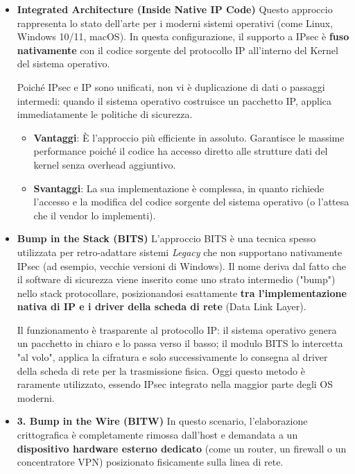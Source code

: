 \documentclass[a4paper, 11pt]{article}
\begin{document}
\begin{itemize}
    \item \textbf{Integrated Architecture (Inside Native IP Code)}
    Questo approccio rappresenta lo stato dell'arte per i moderni sistemi operativi (come Linux, Windows 10/11, macOS). In questa configurazione, il supporto a IPsec è \textbf{fuso nativamente} con il codice sorgente del protocollo IP all'interno del Kernel del sistema operativo.
    
    Poiché IPsec e IP sono unificati, non vi è duplicazione di dati o passaggi intermedi: quando il sistema operativo costruisce un pacchetto IP, applica immediatamente le politiche di sicurezza.
    \begin{itemize}
        \item \textbf{Vantaggi}: È l'approccio più efficiente in assoluto. Garantisce le massime performance poiché il codice ha accesso diretto alle strutture dati del kernel senza overhead aggiuntivo.
        \item \textbf{Svantaggi}: La sua implementazione è complessa, in quanto richiede l'accesso e la modifica del codice sorgente del sistema operativo (o l'attesa che il vendor lo implementi).
    \end{itemize}
    \item \textbf{Bump in the Stack (BITS)}
    L'approccio BITS è una tecnica spesso utilizzata per retro-adattare sistemi \textit{Legacy} che non supportano nativamente IPsec (ad esempio, vecchie versioni di Windows).
    Il nome deriva dal fatto che il software di sicurezza viene inserito come uno strato intermedio ("bump") nello stack protocollare, posizionandosi esattamente \textbf{tra l'implementazione nativa di IP e i driver della scheda di rete} (Data Link Layer).
    
    Il funzionamento è trasparente al protocollo IP: il sistema operativo genera un pacchetto in chiaro e lo passa verso il basso; il modulo BITS lo intercetta "al volo", applica la cifratura e solo successivamente lo consegna al driver della scheda di rete per la trasmissione fisica. Oggi questo metodo è raramente utilizzato, essendo IPsec integrato nella maggior parte degli OS moderni.

    \item \textbf{3. Bump in the Wire (BITW)}
    In questo scenario, l'elaborazione crittografica è completamente rimossa dall'host e demandata a un \textbf{dispositivo hardware esterno dedicato} (come un router, un firewall o un concentratore VPN) posizionato fisicamente sulla linea di rete.
    

\end{itemize}
\end{document}
